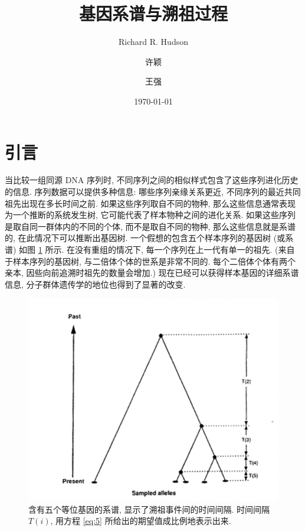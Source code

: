 \documentclass[12pt]{article}
\title{基因系谱与溯祖过程}
\author{Richard R. Hudson \and 许颖 \and 王强}
\institute{University of Chicago \and 南京大学生命科学学院}
\date{\today}
\begin{document}
\maketitle

{
    \setcounter{tocdepth}{3}
    \renewcommand\contentsname{目录}
    \tableofcontents
    \newpage
}

\section{引言}

当比较一组同源 DNA 序列时, 不同序列之间的相似样式包含了这些序列进化历史的信息.
序列数据可以提供多种信息: 哪些序列亲缘关系更近, 不同序列的最近共同祖先出现在多长时间之前.
如果这些序列取自不同的物种, 那么这些信息通常表现为一个推断的系统发生树, 它可能代表了样本物种之间的进化关系.
如果这些序列是取自同一群体内的不同的个体, 而不是取自不同的物种, 那么这些信息就是系谱的, 在此情况下可以推断出基因树.
一个假想的包含五个样本序列的基因树 (或系谱) 如图 \ref{fig:1} 所示.
在没有重组的情况下, 每一个序列在上一代有单一的祖先.
(来自于样本序列的基因树, 与二倍体个体的世系是非常不同的. 每个二倍体个体有两个亲本, 因些向前追溯时祖先的数量会增加.)
现在已经可以获得样本基因的详细系谱信息, 分子群体遗传学的地位也得到了显著的改变.

\begin{figure}
    \centering
    \includegraphics{coalescent-process.images/image1.png}
    \caption{
        含有五个等位基因的系谱, 显示了溯祖事件间的时间间隔.
        时间间隔 $T(i)$, 用方程 \ref{eq:5} 所给出的期望值成比例地表示出来.
    }
    \label{fig:1}
\end{figure}
\end{document}
